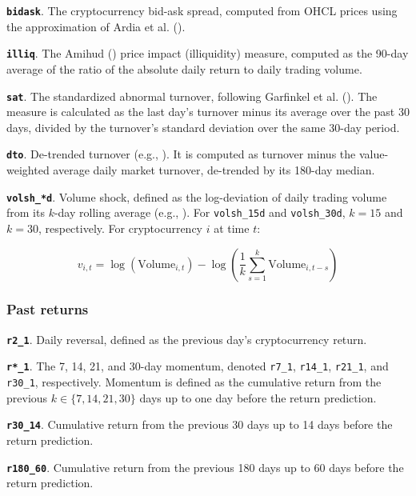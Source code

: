 \documentclass[
  12pt,
  a4paper,
  openany]{scrbook}
\begin{document}
\textbf{\texttt{bidask}}. The cryptocurrency bid-ask spread, computed
from OHCL prices using the approximation of Ardia et al.
().

\textbf{\texttt{illiq}}. The Amihud
() price impact
(illiquidity) measure, computed as the 90-day average of the ratio of
the absolute daily return to daily trading volume.

\textbf{\texttt{sat}}. The standardized abnormal turnover, following
Garfinkel et al. ().
The measure is calculated as the last day's turnover minus its average
over the past 30 days, divided by the turnover's standard deviation over
the same 30-day period.

\textbf{\texttt{dto}}. De-trended turnover (e.g.,
). It is
computed as turnover minus the value-weighted average daily market
turnover, de-trended by its 180-day median.

\textbf{\texttt{volsh\_*d}}. Volume shock, defined as the log-deviation
of daily trading volume from its \(k\)-day rolling average (e.g.,
).
For \texttt{volsh\_15d} and \texttt{volsh\_30d}, \(k = 15\) and
\(k = 30\), respectively. For cryptocurrency \(i\) at time \(t\):

\[
v_{i,t} = \log(\text{Volume}_{i,t}) - \log\left( \frac{1}{k} \sum_{s=1}^{k} \text{Volume}_{i,t-s} \right)
\]

\subsubsection{Past returns}\label{past-returns}

\textbf{\texttt{r2\_1}}. Daily reversal, defined as the previous day's
cryptocurrency return.

\textbf{\texttt{r*\_1}}. The 7, 14, 21, and 30-day momentum, denoted
\texttt{r7\_1}, \texttt{r14\_1}, \texttt{r21\_1}, and \texttt{r30\_1},
respectively. Momentum is defined as the cumulative return from the
previous \(k \in \{7, 14, 21, 30\}\) days up to one day before the
return prediction.

\textbf{\texttt{r30\_14}}. Cumulative return from the previous 30 days
up to 14 days before the return prediction.

\textbf{\texttt{r180\_60}}. Cumulative return from the previous 180 days
up to 60 days before the return prediction.
\end{document}
